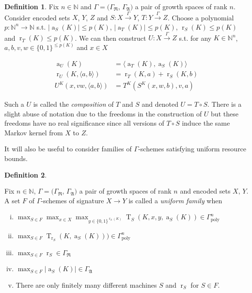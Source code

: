 \documentclass{article}
\numberwithin{equation}{section}
\theoremstyle{definition}
\newtheorem{definition}{Definition}[section]
\theoremstyle{plain}
\newcommand{\Bool}{\{0,1\}}
\DeclareMathOperator{\T}{T}
\DeclareMathOperator{\R}{r}
\DeclareMathOperator{\A}{a}
\newcommand{\Nats}{\mathbb{N}}
\newcommand{\Abs}[1]{\lvert #1 \rvert}
\newcommand{\Chev}[1]{\langle #1 \rangle}
\newcommand{\GrowR}{\Gamma_{\mathfrak{R}}}
\newcommand{\GrowA}{\Gamma_{\mathfrak{A}}}
\newcommand{\BoolR}[1]{\Bool^{\R_{#1}(K)}}
\newcommand{\Scheme}{\xrightarrow{\Gamma}}
\begin{document}
\begin{samepage}
\begin{definition}

Fix $n \in \Nats$ and $\Gamma=(\GrowR$, $\GrowA)$ a pair of growth spaces of rank $n$. Consider encoded sets $X$, $Y$, $Z$ and $S: X \Scheme Y$, $T: Y \Scheme Z$. Choose a polynomial $p: \Nats^n \rightarrow \Nats$ s.t. $\Abs{\A_S(K)} \leq p(K)$, $\Abs{\A_T(K)} \leq p(K)$, $\R_S(K) \leq p(K)$ and $\R_T(K) \leq p(K)$. We can then construct $U: X \Scheme Z$ s.t. for any $K \in \Nats^n$, $a,b,v,w \in \Bool^{\leq p(K)}$ and $x \in X$

\begin{align}
\A_U(K) &= \Chev{\A_T(K),\A_S(K)} \\
\R_U(K, \Chev{a,b}) &= \R_T(K,a)+\R_S(K,b) \\
U^K(x,vw,\Chev{a,b}) &= T^K(S^K(x,w,b),v,a)
\end{align}

Such a $U$ is called the \emph{composition} of $T$ and $S$ and denoted $U = T \circ S$. There is a slight abuse of notation due to the freedoms in the construction of $U$ but these freedoms have no real significance since all versions of $T \circ S$ induce the same Markov kernel from $X$ to $Z$.

\end{definition}
\end{samepage}

It will also be useful to consider families of $\Gamma$-schemes satisfying uniform resource bounds.

\begin{definition}
\label{def:family}

Fix $n \in \Nats$, $\Gamma=(\GrowR$, $\GrowA)$ a pair of growth spaces of rank $n$ and encoded sets $X$, $Y$. A set $F$ of $\Gamma$-schemes of signature $X \rightarrow Y$ is called a \emph{uniform family} when

\begin{enumerate}[(i)]

\item\label{con:def__family__time} $\max_{S \in F} \max_{x \in X} \max_{y \in \BoolR{S}} \T_S(K,x,y,\A_S(K)) \in \Gamma_{\text{poly}}^n$

\item\label{con:def__family__rtime} $\max_{S \in F}\T_{\R_S}(K,\A_S(K))) \in \Gamma_{\text{poly}}^n$

\item\label{con:def__family__rand} $\max_{S \in F} \R_S \in \GrowR$

\item\label{con:def__family__adv} $\max_{S \in F} \Abs{\A_S(K)} \in \GrowA$

\item There are only finitely many different machines ${S}$ and ${\R_S}$ for ${S \in F}$.

\end{enumerate}

\end{definition}
\end{document}
